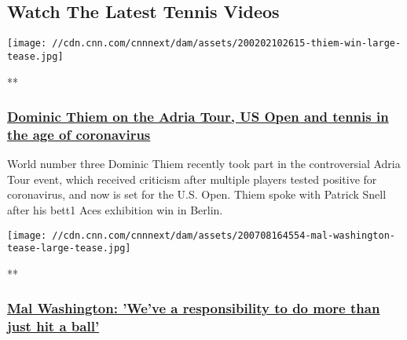 \hypertarget{watch-the-latest-tennis-videos-}{%
\subsection{Watch The Latest Tennis
Videos~}\label{watch-the-latest-tennis-videos-}}

\href{/videos/sports/2020/07/21/dominic-thiem-us-open-adria-tour-tennis-age-of-coronavirus-spt-intl.cnn}{}

\texttt{[image: //cdn.cnn.com/cnnnext/dam/assets/200202102615-thiem-win-large-tease.jpg]}

**

\hypertarget{dominic-thiem-on-the-adria-tour-us-open-and-tennis-in-the-age-of-coronavirus}{%
\subsubsection{\texorpdfstring{\href{/videos/sports/2020/07/21/dominic-thiem-us-open-adria-tour-tennis-age-of-coronavirus-spt-intl.cnn}{Dominic
Thiem on the Adria Tour, US Open and tennis in the age of
coronavirus}}{Dominic Thiem on the Adria Tour, US Open and tennis in the age of coronavirus}}\label{dominic-thiem-on-the-adria-tour-us-open-and-tennis-in-the-age-of-coronavirus}}

World number three Dominic Thiem recently took part in the controversial
Adria Tour event, which received criticism after multiple players tested
positive for coronavirus, and now is set for the U.S. Open. Thiem spoke
with Patrick Snell after his bett1 Aces exhibition win in Berlin.

\href{/videos/sports/2020/07/08/malivai-mal-washington-wimbledon-diversity-tennis-black-players-spt-intl-lon-orig.cnn}{}

\texttt{[image: //cdn.cnn.com/cnnnext/dam/assets/200708164554-mal-washington-tease-large-tease.jpg]}

**

\hypertarget{mal-washington-weve-a-responsibility-to-do-more-than-just-hit-a-ball}{%
\subsubsection{\texorpdfstring{\href{/videos/sports/2020/07/08/malivai-mal-washington-wimbledon-diversity-tennis-black-players-spt-intl-lon-orig.cnn}{Mal
Washington: 'We've a responsibility to do more than just hit a
ball'}}{Mal Washington: 'We've a responsibility to do more than just hit a ball'}}\label{mal-washington-weve-a-responsibility-to-do-more-than-just-hit-a-ball}}

